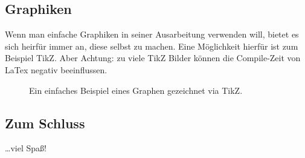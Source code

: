 \documentclass[a4paper,12pt]{llncs}
\numberwithin{equation}{section}
\begin{document}
\subsection{Graphiken}
Wenn man einfache Graphiken in seiner Ausarbeitung verwenden will, bietet es sich heirfür immer an, diese selbst zu machen. 
Eine Möglichkeit hierfür ist zum Beispiel TikZ.
Aber Achtung: zu viele TikZ Bilder können die Compile-Zeit von LaTex negativ beeinflussen.

\begin{figure}[htbp]
    \centering
    \caption{Ein einfaches Beispiel eines Graphen gezeichnet via TikZ.}
    \label{fig:tikz}
\end{figure}

\subsection{Zum Schluss}
\dots viel Spaß!




\end{document}
